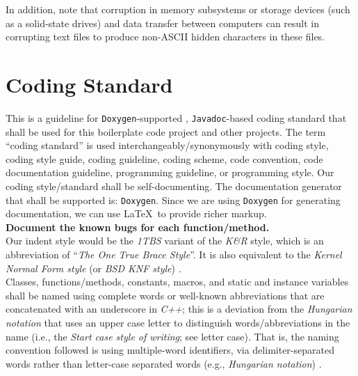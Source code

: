 \documentclass[letter,12pt]{article}
\begin{document}
In addition, note that corruption in memory subsystems or storage devices (such as a solid-state drives) and data transfer between computers can result in corrupting text files to produce non-ASCII hidden characters in these files.





\section{Coding Standard}
\label{sec:CodingStandard}

This is a guideline for {\tt Doxygen}-supported \cite{vanHeesch2016}, {\tt Javadoc}-based \cite{Long1995} coding standard that shall be used for this boilerplate code project and other projects. The term ``coding standard'' is used interchangeably/synonymously with coding style, coding style guide, coding guideline, coding scheme, code convention, code documentation guideline, programming guideline, or programming style. Our coding style/standard shall be self-documenting. The documentation generator that shall be supported is: {\tt Doxygen}. Since we are using {\tt Doxygen} for generating documentation, we can use \LaTeX\ to provide richer markup. \\

{\bf Document the known bugs for each function/method.} \\

Our indent style would be the {\it 1TBS} variant of the {\it K{\rm \&}R} style, which is an abbreviation of ``{\it The One True Brace Style}''. It is also equivalent to the {\it Kernel Normal Form style} (or {\it BSD KNF style}) \cite{WikipediaContributors2016j}. \\

Classes, functions/methods, constants, macros, and static and instance variables shall be named using complete words or well-known abbreviations that are concatenated with an underscore in {\it C++}; this is a deviation from the {\it Hungarian notation} that uses an upper case letter to distinguish words/abbreviations in the name (i.e., the {\it Start case style of writing}; see letter case). That is, the naming convention followed is using multiple-word identifiers, via delimiter-separated words rather than letter-case separated words (e.g., {\it Hungarian notation}) \cite{WikipediaContributors2017}. \\
\end{document}
